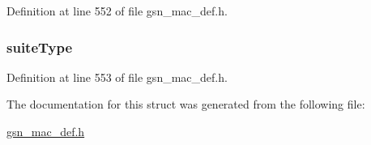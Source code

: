 Definition at line 552 of file gsn\_\-mac\_\-def.h.

\hypertarget{a00128_a9f7d433bf6b97f3d6ea052a0c620d947}{
\subsubsection[{suiteType}]{ {\bf suiteType}}}
\label{a00128_a9f7d433bf6b97f3d6ea052a0c620d947}


Definition at line 553 of file gsn\_\-mac\_\-def.h.



The documentation for this struct was generated from the following file:\begin{DoxyCompactItemize}
\item 
\hyperlink{a00522}{gsn\_\-mac\_\-def.h}\end{DoxyCompactItemize}
